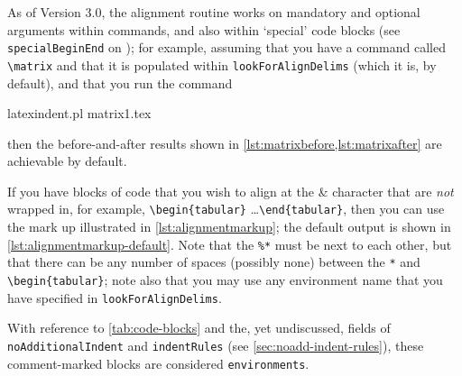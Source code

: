 	As of Version 3.0, the alignment routine works on mandatory and optional arguments within commands, and also within `special' code blocks
	(see \texttt{specialBeginEnd} on ); for example, assuming that you have a command called \lstinline!\matrix!
	and that it is populated within \texttt{lookForAlignDelims} (which it is, by default), and that you
	run the command
	\begin{commandshell}
latexindent.pl matrix1.tex 
    \end{commandshell}
	then the before-and-after results
	shown in \cref{lst:matrixbefore,lst:matrixafter} are achievable by default.

	\begin{minipage}{.45\textwidth}
	\end{minipage}%
	\hfill
	\begin{minipage}{.45\textwidth}
	\end{minipage}%

	If you have blocks of code that you wish to align at the \&  character that
	are \emph{not} wrapped in, for example, \lstinline!\begin{tabular}! \ldots \lstinline!\end{tabular}!, then you can use the mark up
	illustrated in \cref{lst:alignmentmarkup}; the default output is shown in \cref{lst:alignmentmarkup-default}. Note that the \lstinline!%*! must be next to
	each other, but that there can be any number of spaces (possibly none) between the
	\lstinline!*! and \lstinline!\begin{tabular}!; note also that you may use any
	environment name that you have specified in \texttt{lookForAlignDelims}.

	\begin{minipage}{.45\textwidth}
	\end{minipage}%
	\hfill
	\begin{minipage}{.45\textwidth}
	\end{minipage}%

	With reference to \vref{tab:code-blocks} and the, yet undiscussed, fields of \texttt{noAdditionalIndent} and \texttt{indentRules}
	(see \vref{sec:noadd-indent-rules}), these comment-marked blocks are considered \texttt{environments}.

